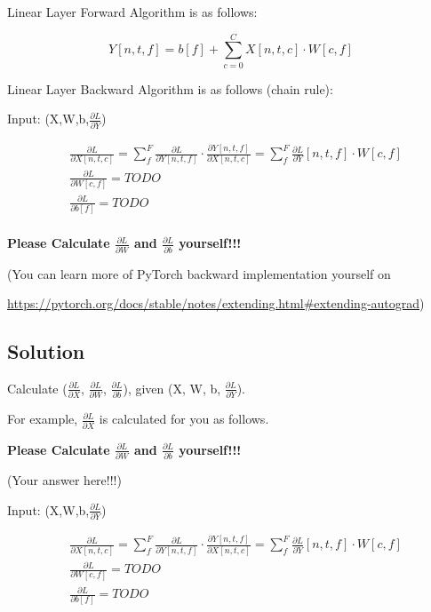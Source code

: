 \documentclass[12pt,a4paper]{article}
\theoremstyle{definition}
\begin{document}
    Linear Layer Forward Algorithm is as follows:

    \begin{equation}
        Y[n,t,f] = b[f] + \sum_{c=0}^{C} X[n,t,c]\cdot W[c,f]
    \end{equation}

    Linear Layer Backward Algorithm is as follows (chain rule):

    Input: (X,W,b,$\frac{\partial L}{\partial Y}$)

    \begin{equation}
        \begin{aligned}
            &\frac{\partial L}{\partial X[n,t,c]} = 
            \sum_{f}^F\frac{\partial L}{\partial Y[n,t,f]}\cdot \frac{\partial Y[n,t,f]}{\partial X[n,t,c]}= \sum_{f}^F\frac{\partial L}{\partial Y}[n,t,f]\cdot W[c,f]\\
            &\frac{\partial L}{\partial W[c,f]} = 
            TODO \\
            &\frac{\partial L}{\partial b[f]} = 
            TODO \\
        \end{aligned}
    \end{equation}

    \textbf{    Please Calculate $\frac{\partial L}{\partial W}$ and $\frac{\partial L}{\partial b}$ yourself!!!}

    (You can learn more of PyTorch backward implementation yourself on 
    
    \href{extend}{https://pytorch.org/docs/stable/notes/extending.html\#extending-autograd})

\subsection{Solution}
    Calculate ($\frac{\partial L}{\partial X}$, $\frac{\partial L}{\partial W}$, $\frac{\partial L}{\partial b}$), given (X, W, b, $\frac{\partial L}{\partial Y}$).
    
    For example, $\frac{\partial L}{\partial X}$ is calculated for you as follows.

    \textbf{    Please Calculate $\frac{\partial L}{\partial W}$ and $\frac{\partial L}{\partial b}$ yourself!!!}

    (Your answer here!!!)
    
    Input: (X,W,b,$\frac{\partial L}{\partial Y}$)

    \begin{equation}
        \begin{aligned}
            &\frac{\partial L}{\partial X[n,t,c]} = 
            \sum_{f}^F\frac{\partial L}{\partial Y[n,t,f]}\cdot \frac{\partial Y[n,t,f]}{\partial X[n,t,c]}= \sum_{f}^F\frac{\partial L}{\partial Y}[n,t,f]\cdot W[c,f]\\
            &\frac{\partial L}{\partial W[c,f]} = 
            TODO \\
            &\frac{\partial L}{\partial b[f]} = 
            TODO \\
        \end{aligned}
    \end{equation}
\end{document}
